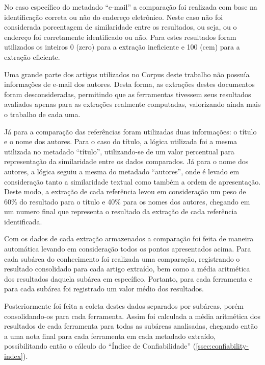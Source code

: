 No caso específico do metadado ``e-mail'' a comparação foi realizada com base na identificação correta ou não do endereço eletrônico. Neste caso não foi considerada porcentagem de similaridade entre os resultados, ou seja, ou o endereço foi corretamente identificado ou não. Para estes resultados foram utilizados os inteiros 0 (zero) para a extração ineficiente e 100 (cem) para a extração eficiente.


Uma grande parte dos artigos utilizados no Corpus deste trabalho não possuía informações de e-mail dos autores. Desta forma, as extrações destes documentos foram desconsideradas, permitindo que as ferramentas tivessem seus resultados avaliados apenas para as extrações realmente computadas, valorizando ainda mais o trabalho de cada uma.


Já para a comparação das referências foram utilizadas duas informações: o título e o nome dos autores. Para o caso do título, a lógica utilizada foi a mesma utilizada no metadado ``título'', utilizando-se de um valor percentual para representação da similaridade entre os dados comparados. Já para o nome dos autores, a lógica seguiu a mesma do metadado ``autores'', onde é levado em consideração tanto a similaridade textual como também a ordem de apresentação. Deste modo, a extração de cada referência levou em consideração um peso de 60\% do resultado para o título e 40\% para os nomes dos autores, chegando em um numero final que representa o resultado da extração de cada referência identificada.


Com os dados de cada extração armazenados a comparação foi feita de maneira automática levando em consideração todos os pontos apresentados acima. Para cada subárea do conhecimento foi realizada uma comparação, registrando o resultado consolidado para cada artigo extraído, bem como a média aritmética dos resultados daquela subárea em específico. Portanto, para cada ferramenta e para cada subárea foi registrado um valor médio dos resultados.

Posteriormente foi feita a coleta destes dados separados por subáreas, porém consolidando-os para cada ferramenta. Assim foi calculada a média aritmética dos resultados de cada ferramenta para todas as subáreas analisadas, chegando então a uma nota final para cada ferramenta em cada metadado extraído, possibilitando então o cálculo do ``Índice de Confiabilidade'' (\autoref{ssec:confiability-index}).


